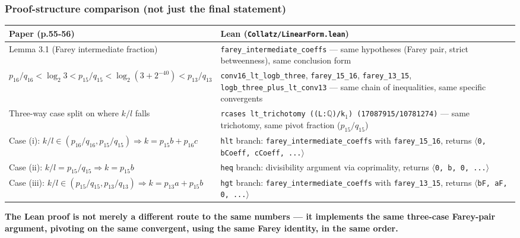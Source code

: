 \documentclass[11pt]{article}
\begin{document}
\subsubsection*{Proof-structure comparison (not just the final statement)}
\begin{center}\small\begin{tabular}{p{}p{}}\toprule
Paper (p.55-56) & Lean (\texttt{Collatz/LinearForm.lean}) \\ \midrule
Lemma 3.1 (Farey intermediate fraction) & \texttt{farey\_intermediate\_coeffs} --- same hypotheses (Farey pair, strict betweenness), same conclusion form \\
$p_{16}/q_{16} < \log_2 3 < p_{15}/q_{15} < \log_2(3+2^{-40}) < p_{13}/q_{13}$ & \texttt{conv16\_lt\_logb\_three}, \texttt{farey\_15\_16}, \texttt{farey\_13\_15}, \texttt{logb\_three\_plus\_lt\_conv13} --- same chain of inequalities, same specific convergents \\
Three-way case split on where $k/l$ falls & \texttt{rcases lt\_trichotomy ((L:\ensuremath{\mathbb{Q}})/k\ensuremath{_{1}}) (17087915/10781274)} --- same trichotomy, same pivot fraction ($p_{15}/q_{15}$) \\
Case (i): $k/l\in(p_{16}/q_{16},p_{15}/q_{15}) \Rightarrow k=p_{15}b+p_{16}c$ & \texttt{hlt} branch: \texttt{farey\_intermediate\_coeffs} with \texttt{farey\_15\_16}, returns \texttt{\ensuremath{\langle}0, bCoeff, cCoeff, ...\ensuremath{\rangle}} \\
Case (ii): $k/l=p_{15}/q_{15} \Rightarrow k=p_{15}b$ & \texttt{heq} branch: divisibility argument via coprimality, returns \texttt{\ensuremath{\langle}0, b, 0, ...\ensuremath{\rangle}} \\
Case (iii): $k/l\in(p_{15}/q_{15},p_{13}/q_{13}) \Rightarrow k=p_{13}a+p_{15}b$ & \texttt{hgt} branch: \texttt{farey\_intermediate\_coeffs} with \texttt{farey\_13\_15}, returns \texttt{\ensuremath{\langle}bF, aF, 0, ...\ensuremath{\rangle}} \\
\bottomrule\end{tabular}\end{center}
\textbf{The Lean proof is not merely a different route to the same numbers --- it implements the same three-case Farey-pair argument, pivoting on the same convergent, using the same Farey identity, in the same order.}
\end{document}
